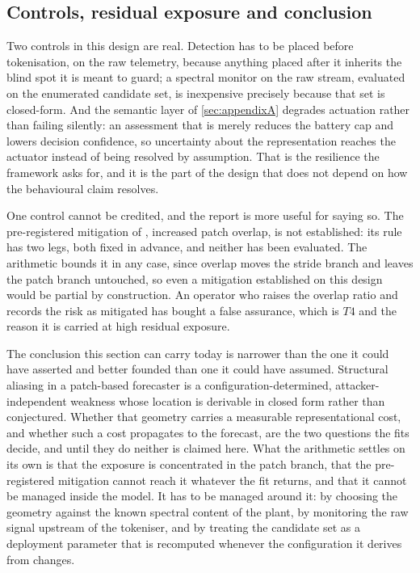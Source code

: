\subsection{Controls, residual exposure and conclusion}

Two controls in this design are real. Detection has to be placed before tokenisation, on the raw telemetry, because anything placed after it inherits the blind spot it is meant to guard; a spectral monitor on the raw stream, evaluated on the enumerated candidate set, is inexpensive precisely because that set is closed-form. And the semantic layer of \autoref{sec:appendixA} degrades actuation rather than failing silently: an assessment that is merely  reduces the battery cap and lowers decision confidence, so uncertainty about the representation reaches the actuator instead of being resolved by assumption. That is the resilience the framework asks for, and it is the part of the design that does not depend on how the behavioural claim resolves.

One control cannot be credited, and the report is more useful for saying so. The pre-registered mitigation of , increased patch overlap, is not established: its rule has two legs, both fixed in advance, and neither has been evaluated. The arithmetic bounds it in any case, since overlap moves the stride branch and leaves the patch branch untouched, so even a mitigation established on this design would be partial by construction. An operator who raises the overlap ratio and records the risk as mitigated has bought a false assurance, which is $T4$ and the reason it is carried at high residual exposure.

The conclusion this section can carry today is narrower than the one it could have asserted and better founded than one it could have assumed. Structural aliasing in a patch-based forecaster is a configuration-determined, attacker-independent weakness whose location is derivable in closed form rather than conjectured. Whether that geometry carries a measurable representational cost, and whether such a cost propagates to the forecast, are the two questions the fits decide, and until they do neither is claimed here. What the arithmetic settles on its own is that the exposure is concentrated in the patch branch, that the pre-registered mitigation cannot reach it whatever the fit returns, and that it cannot be managed inside the model. It has to be managed around it: by choosing the geometry against the known spectral content of the plant, by monitoring the raw signal upstream of the tokeniser, and by treating the candidate set as a deployment parameter that is recomputed whenever the configuration it derives from changes.

